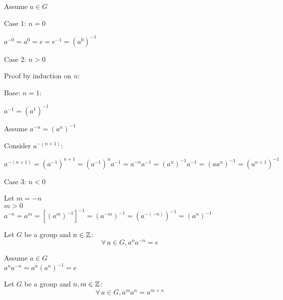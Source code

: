 \documentclass[letterpaper,12pt,fleqn]{article}
\begin{document}
\begin{theproof}
  Assume $a\in G$

  \begin{description}
  \item{Case 1: $n=0$}

    $a^{-0}=a^0=e=e^{-1}=(a^0)^{-1}$ \\

  \item {Case 2: $n>0$}

    Proof by induction on $n$:

    \begin{description}
    \item{Base: $n=1$:}

      $a^{-1}=(a^1)^{-1}$

    \item{Assume $a^{-n}=(a^n)^{-1}$}

    \item{Consider $a^{-(n+1)}$:}
      
      $a^{-(n+1)}=(a^{-1})^{n+1}=(a^{-1})^na^{-1}=a^{-n}a^{-1}=(a^n)^{-1}a^{-1}=
      (aa^n)^{-1}=(a^{n+1})^{-1}$
    \end{description}

  \item{Case 3: $n<0$}

    Let $m=-n$ \\
    $m>0$ \\
    $a^{-n}=a^m=[(a^m)^{-1}]^{-1}=(a^{-m})^{-1}=(a^{-(-n)})^{-1}=(a^n)^{-1}$
  \end{description}
\end{theproof}

\begin{corollary}
  Let $G$ be a group and $n\in\mathbb{Z}$:
  \[\forall\,a\in G,a^na^{-n}=e\]
\end{corollary}

\begin{theproof}
  Assume $a\in G$ \\
  $a^na^{-n}=a^n(a^n)^{-1}=e$
\end{theproof}

\begin{theorem}
  Let $G$ be a group and $n,m\in\mathbb{Z}$:
  \[\forall\,a\in G,a^ma^n=a^{m+n}\]
\end{theorem}
\end{document}
